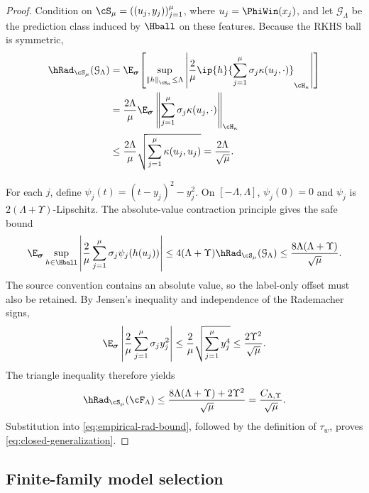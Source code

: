 \begin{proof}
Condition on \(\cS_\mu=((u_j,y_j))_{j=1}^\mu\), where
\(u_j=\PhiWin(x_j)\), and let \(\mathcal G_\Lambda\) be the prediction class
induced by \(\Hball\) on these features. Because the RKHS ball is symmetric,
\begin{align*}
    \hRad_{\cS_\mu}(\mathcal G_\Lambda)
    &=
    \E_{\bm\sigma}\!\left[
      \sup_{\norm{h}_{\cH_\kappa}\leq\Lambda}
      \abs{\frac2\mu
      \ip{h}{\sum_{j=1}^\mu\sigma_j\kappa(u_j,\cdot)}_{\cH_\kappa}}
    \right]\\
    &=
    \frac{2\Lambda}{\mu}
    \E_{\bm\sigma}
    \norm{\sum_{j=1}^\mu\sigma_j\kappa(u_j,\cdot)}_{\cH_\kappa}\\
    &\leq
    \frac{2\Lambda}{\mu}
    \sqrt{\sum_{j=1}^\mu\kappa(u_j,u_j)}
    =\frac{2\Lambda}{\sqrt\mu}.
\end{align*}

For each \(j\), define
\(\psi_j(t)=(t-y_j)^2-y_j^2\). On \([-\Lambda,\Lambda]\),
\(\psi_j(0)=0\) and \(\psi_j\) is
\(2(\Lambda+\Upsilon)\)-Lipschitz. The absolute-value contraction principle
\citep{BartlettMendelson2002} gives the safe bound
\[
    \E_{\bm\sigma}\sup_{h\in\Hball}
    \abs{\frac2\mu\sum_{j=1}^\mu\sigma_j\psi_j(h(u_j))}
    \leq
    4(\Lambda+\Upsilon)
    \hRad_{\cS_\mu}(\mathcal G_\Lambda)
    \leq
    \frac{8\Lambda(\Lambda+\Upsilon)}{\sqrt\mu}.
\]
The source convention contains an absolute value, so the label-only offset must
also be retained. By Jensen's inequality and independence of the Rademacher
signs,
\[
    \E_{\bm\sigma}
    \abs{\frac2\mu\sum_{j=1}^\mu\sigma_j y_j^2}
    \leq
    \frac2\mu\sqrt{\sum_{j=1}^\mu y_j^4}
    \leq\frac{2\Upsilon^2}{\sqrt\mu}.
\]
The triangle inequality therefore yields
\[
    \hRad_{\cS_\mu}(\cF_\Lambda)
    \leq
    \frac{8\Lambda(\Lambda+\Upsilon)+2\Upsilon^2}{\sqrt\mu}
    =\frac{C_{\Lambda,\Upsilon}}{\sqrt\mu}.
\]
Substitution into \cref{eq:empirical-rad-bound}, followed by the definition of
\(\tau_w\), proves \cref{eq:closed-generalization}.
\end{proof}

\subsection{Finite-family model selection}

